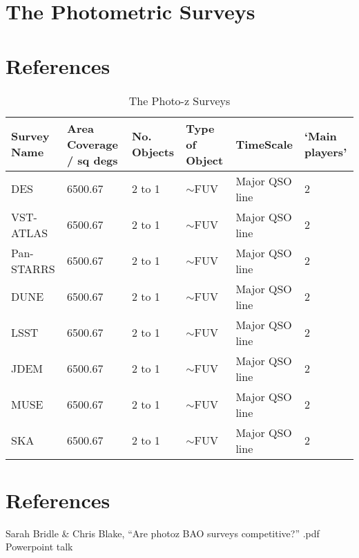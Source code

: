 \documentclass[11pt]{article}
\begin{document}
\section{The Photometric Surveys}

\section{References}
\begin{table}
  \caption{The Photo-z Surveys}
  \label{tab:the_lines}
  \begin{center}
    \begin{tabular}{llllll} 
      \hline
      \hline
      Survey Name & Area Coverage / sq degs & No. Objects & Type of Object & 
      TimeScale   & `Main players' \\
      \hline
      DES        & 6500.67 & 2 to 1 & $\sim$FUV & Major QSO line & 2 \\
      VST-ATLAS        & 6500.67 & 2 to 1 & $\sim$FUV & Major QSO line & 2 \\
      Pan-STARRS       & 6500.67 & 2 to 1 & $\sim$FUV & Major QSO line & 2 \\
      DUNE       & 6500.67 & 2 to 1 & $\sim$FUV & Major QSO line & 2 \\
      LSST       & 6500.67 & 2 to 1 & $\sim$FUV & Major QSO line & 2 \\
      JDEM       & 6500.67 & 2 to 1 & $\sim$FUV & Major QSO line & 2 \\
      MUSE       & 6500.67 & 2 to 1 & $\sim$FUV & Major QSO line & 2 \\
      SKA       & 6500.67 & 2 to 1 & $\sim$FUV & Major QSO line & 2 \\
      \hline
      \hline
    \end{tabular}
  \end{center}
\end{table}

\section{References}

Sarah Bridle \& Chris Blake,
 ``Are photoz BAO surveys competitive?'' .pdf \/Powerpoint talk
\end{document}
